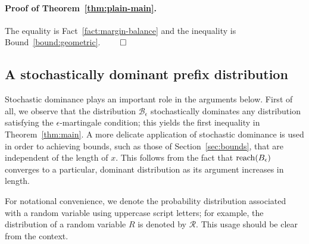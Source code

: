 \paragraph{Proof of Theorem~\ref{thm:plain-main}.}
The equality is Fact~\ref{fact:margin-balance} 
and the inequality is Bound~\ref{bound:geometric}. $\qed$





\subsection{A stochastically dominant prefix distribution}\label{sec:dominance-rho-stationary}

Stochastic dominance plays an important role in the arguments
below. First of all, we observe that the distribution
$\mathcal{B}_\epsilon$ stochastically dominates any distribution
satisfying the $\epsilon$-martingale condition; this yields the first
inequality in Theorem~\ref{thm:main}. A more delicate application of
stochastic dominance is used in order to achieving bounds, such as
those of Section~\ref{sec:bounds}, that are independent of the length of
$x$. This follows from the fact that $\operatorname{reach}(B_{\epsilon})$ converges to a
particular, dominant distribution as its argument increases in length.

For notational convenience, we denote
the probability distribution associated with a random variable using
uppercase script letters; for example, the distribution of a random
variable $R$ is denoted by $\mathcal{R}$.  This usage should be clear
from the context.



